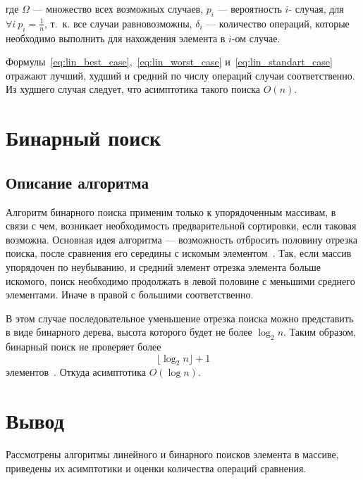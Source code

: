 где $\Omega$ --- множество всех возможных случаев, $p_i$ --- вероятность $i$- случая, для $\forall i\ p_i = \frac{1}{n}$, т.~к. все случаи равновозможны, $\delta_i$ --- количество операций, которые необходимо выполнить для нахождения элемента в $i$-ом случае. 

Формулы~\ref{eq:lin_best_case},~\ref{eq:lin_worst_case} и~\ref{eq:lin_standart_case} отражают лучший, худший и средний по числу операций случаи соответственно. Из худшего случая следует, что асимптотика такого поиска $O(n)$.

\section{Бинарный поиск}
\subsection{Описание алгоритма}

Алгоритм бинарного поиска применим только к упорядоченным массивам, в связи с чем, возникает необходимость предварительной сортировки, если таковая возможна.
Основная идея алгоритма --- возможность отбросить половину отрезка поиска, после сравнения его середины с искомым элементом~\cite{Sedgewick03}. Так, если массив упорядочен по неубыванию, и средний элемент отрезка элемента больше искомого, поиск необходимо продолжать в левой половине с меньшими среднего элементами. Иначе в правой с большими соответственно.

В этом случае последовательное уменьшение отрезка поиска можно представить в виде бинарного дерева, высота которого будет не более $\log_2{n}$. Таким образом, бинарный поиск не проверяет более 
\begin{equation}
	\label{eq:bin_cnt_elems}
	\lfloor \log_2{n} \rfloor + 1
\end{equation}
элементов~\cite{Sedgewick03}. Откуда асимптотика $O(\log{n})$.

\section*{Вывод}

Рассмотрены алгоритмы линейного и бинарного поисков элемента в массиве, приведены их асимптотики и оценки количества операций сравнения.

\clearpage